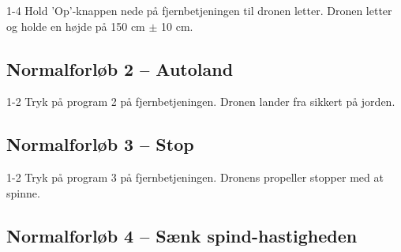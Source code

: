 \documentclass[Main]{subfiles}
\begin{document}
\begin{TestCase}
\TC
{1-4}
{Hold 'Op'-knappen nede på fjernbetjeningen til dronen letter.}
{Dronen letter og holde en højde på 150 cm $\pm$ 10 cm.}
{}
\end{TestCase}





\subsection*{Normalforløb 2 -- Autoland}

\begin{TestCaseIntro}
\end{TestCaseIntro}

\begin{TestCase}
\TC
{1-2}
{Tryk på program 2 på fjernbetjeningen.}
{Dronen lander fra sikkert på jorden.}
{}
\end{TestCase}




\subsection*{Normalforløb 3 -- Stop}

\begin{TestCaseIntro}
\end{TestCaseIntro}

\begin{TestCase}
\TC
{1-2}
{Tryk på program 3 på fjernbetjeningen.}
{Dronens propeller stopper med at spinne.}
{}
\end{TestCase}




\newpage
\subsection*{Normalforløb 4 -- Sænk spind-hastigheden}

\begin{TestCaseIntro}
\end{TestCaseIntro}
\end{document}

